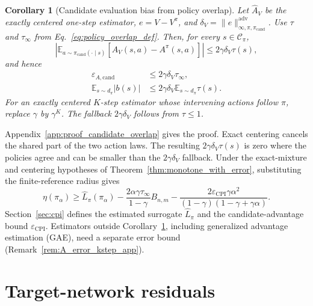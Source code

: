 \documentclass{article}
\theoremstyle{plain}
\newtheorem{corollary}[theorem]{Corollary}
\theoremstyle{definition}
\theoremstyle{remark}
\newcommand{\E}{\mathbb{E}}
\begin{document}
\begin{corollary}[Candidate evaluation bias from policy overlap]
\label{cor:candidate_overlap}
Let $\widehat A_V$ be the exactly centered one-step estimator,
$e=V-V^\pi$, and
$\delta_V=\|e\|_{\infty,\pi,\pi_{\mathrm{cand}}}^{\mathrm{adv}}$.
Use $\tau$ and $\tau_\infty$ from Eq.~\eqref{eq:policy_overlap_def}.
Then, for every $s\in\mathcal C_\pi$,
\begin{equation}
\left|
\E_{a\sim\pi_{\mathrm{cand}}(\cdot\mid s)}
[\widehat A_V(s,a)-A^\pi(s,a)]
\right|
\le 2\gamma\delta_V\tau(s),
\label{eq:candidate_overlap_pointwise}
\end{equation}
and hence
\begin{align}
\varepsilon_{A,\mathrm{cand}}
&\le2\gamma\delta_V\tau_\infty,
\label{eq:candidate_overlap_uniform}\\
\E_{s\sim d_\pi}|b(s)|
&\le2\gamma\delta_V\E_{s\sim d_\pi}\tau(s).
\label{eq:candidate_overlap_average}
\end{align}
For an exactly centered $K$-step estimator whose intervening actions follow
$\pi$, replace $\gamma$ by $\gamma^K$. The fallback
$2\gamma\delta_V$ follows from $\tau\le1$.
\end{corollary}

Appendix~\ref{app:proof_candidate_overlap} gives the proof.
Exact centering cancels the shared part of the two action laws. The resulting
$2\gamma\delta_V\tau(s)$ is zero where the policies agree and can be smaller
than the $2\gamma\delta_V$ fallback. Under the exact-mixture and centering
hypotheses of Theorem~\ref{thm:monotone_with_error}, substituting the
finite-reference radius gives
\begin{equation}
\eta(\pi_\alpha)
\ge
\widehat L_\pi(\pi_\alpha)
-\frac{2\alpha\gamma\tau_\infty}{1-\gamma}B_{n,m}
-\frac{2\varepsilon_{\mathrm{CPI}}\gamma\alpha^2}
{(1-\gamma)(1-\gamma+\gamma\alpha)}.
\label{eq:finite_reference_cpi}
\end{equation}
Section~\ref{sec:cpi} defines the estimated surrogate $\widehat L_\pi$ and the
candidate-advantage bound $\varepsilon_{\mathrm{CPI}}$. Estimators outside
Corollary~\ref{cor:candidate_overlap}, including generalized advantage
estimation (GAE), need a separate error bound
(Remark~\ref{rem:A_error_kstep_app}).

\section{Target-network residuals}
\label{sec:contraction}
\end{document}
